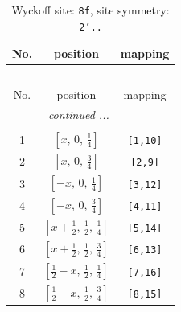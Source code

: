 \documentclass[fleqn,8pt]{jsarticle}
\begin{document}
\begin{longtable}{ccc}
\caption{Wyckoff site: {\tt 8f}, site symmetry: {\tt 2'..}}
 \\
 \hline \hline
No. & position & mapping \\ \hline \endfirsthead

\multicolumn{2}{l}{\tablename\ \thetable{}} \\
 \hline \hline
No. & position & mapping \\ \hline \endhead

 \hline \hline
\multicolumn{2}{r}{\footnotesize\it continued ...} \\ \endfoot

 \hline \hline
\multicolumn{2}{r}{} \\ \endlastfoot

1 & $\left[ x,\, 0,\, \frac{1}{4} \right]$ & {\tt [1,10]} \\ \hline
2 & $\left[ x,\, 0,\, \frac{3}{4} \right]$ & {\tt [2,9]} \\ \hline
3 & $\left[ - x,\, 0,\, \frac{1}{4} \right]$ & {\tt [3,12]} \\ \hline
4 & $\left[ - x,\, 0,\, \frac{3}{4} \right]$ & {\tt [4,11]} \\ \hline
5 & $\left[ x + \frac{1}{2},\, \frac{1}{2},\, \frac{1}{4} \right]$ & {\tt [5,14]} \\ \hline
6 & $\left[ x + \frac{1}{2},\, \frac{1}{2},\, \frac{3}{4} \right]$ & {\tt [6,13]} \\ \hline
7 & $\left[ \frac{1}{2} - x,\, \frac{1}{2},\, \frac{1}{4} \right]$ & {\tt [7,16]} \\ \hline
8 & $\left[ \frac{1}{2} - x,\, \frac{1}{2},\, \frac{3}{4} \right]$ & {\tt [8,15]} \\
\end{longtable}
\renewcommand{\arraystretch}{1.2}
\end{document}

